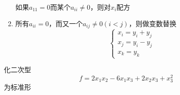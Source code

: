 \documentclass[11pt]{article}
\begin{document}
\begin{enumerate}
如果\(a_{11}=0\)而某个\(a_{ii}\neq0\)，则对\(x_i\)配方

\item 所有\(a_{ii}=0\)，而又一个\(a_{ij}\neq0(i<j)\)，则做变数替换
\begin{equation*}
\begin{cases}
x_i=y_i+y_j\\
x_j=y_i-y_j\\
x_k=y_k
\end{cases}
\end{equation*}
\end{enumerate}



\begin{examplle}[]
化二次型
\begin{equation*}
f=2x_1x_2-6x_1x_3+2x_2x_3+x_3^2
\end{equation*}
为标准形


\end{examplle}
\end{document}
